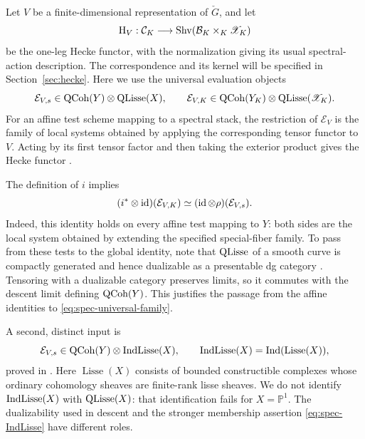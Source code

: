 Let $V$ be a finite-dimensional representation of $\check G$, and let
\[
 \mathrm H_V:\mathcal C_K\longrightarrow
       \operatorname{Shv}(\mathcal B_K\times_K\mathscr X_K)
\]
be the one-leg Hecke functor, with the normalization giving its usual
spectral-action description.  The correspondence and its kernel will be
specified in Section~\ref{sec:hecke}.  Here we use the universal evaluation
objects
\[
 \mathcal E_{V,s}\in\operatorname{QCoh}(Y)\otimes\operatorname{QLisse}(X),\qquad
 \mathcal E_{V,K}\in\operatorname{QCoh}(Y_K)\otimes\operatorname{QLisse}(\mathscr X_K).
\]
For an affine test scheme mapping to a spectral stack, the restriction of
$\mathcal E_V$ is the family of local systems obtained by applying the
corresponding tensor functor to $V$.  Acting by its first tensor factor and
then taking the exterior product gives the Hecke functor
\cite[\S14.3.3]{AGKRRV}.

The definition of $i$ implies
\begin{equation}
 (i^*\otimes\operatorname{id})(\mathcal E_{V,K})
 \simeq (\operatorname{id}\otimes\rho)(\mathcal E_{V,s}).
 \label{eq:spec-universal-family}
\end{equation}
Indeed, this identity holds on every affine test mapping to $Y$: both sides
are the local system obtained by extending the specified special-fiber
family.  To pass from these tests to the global identity, note that
$\operatorname{QLisse}$ of a smooth curve is compactly generated and hence dualizable
as a presentable dg category
\cite[\S1.2.11 and \S\S E.2.6--E.2.7]{AGKRRV}.
Tensoring with a dualizable category preserves limits, so it commutes with
the descent limit defining $\operatorname{QCoh}(Y)$.  This justifies the passage from the
affine identities to \eqref{eq:spec-universal-family}.

A second, distinct input is
\begin{equation}
 \mathcal E_{V,s}\in\operatorname{QCoh}(Y)\otimes\operatorname{IndLisse}(X),
 \qquad \operatorname{IndLisse}(X)=\operatorname{Ind}(\operatorname{Lisse}(X)),
 \label{eq:spec-IndLisse}
\end{equation}
proved in \cite[Remark~14.3.9]{AGKRRV}.  Here
$\operatorname{Lisse}(X)$ consists of bounded constructible complexes
whose ordinary cohomology sheaves are finite-rank lisse sheaves.
We do not identify $\operatorname{IndLisse}(X)$ with $\operatorname{QLisse}(X)$: that identification
fails for $X=\mathbb P^1$.  The dualizability used in descent and the
stronger membership assertion \eqref{eq:spec-IndLisse} have different roles.


